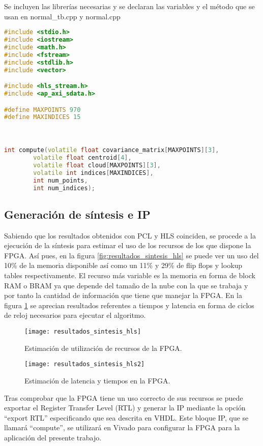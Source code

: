Se incluyen las librerías necesarias y se declaran las variables y el método que se usan en normal\_tb.cpp y normal.cpp

\begin{lstlisting}[language=C++,breaklines]
#include <stdio.h>
#include <iostream>
#include <math.h>
#include <fstream>
#include <stdlib.h>
#include <vector>

#include <hls_stream.h>
#include <ap_axi_sdata.h>

#define MAXPOINTS 970
#define MAXINDICES 15



int compute(volatile float covariance_matrix[MAXPOINTS][3],
		volatile float centroid[4],
		volatile float cloud[MAXPOINTS][3],
		volatile int indices[MAXINDICES],
		int num_points,
		int num_indices);
\end{lstlisting}


\subsection{Generación de síntesis e IP}

Sabiendo que los resultados obtenidos con PCL y HLS coinciden, se procede a la ejecución de la síntesis para estimar el uso de los recursos de los que dispone la FPGA. Así pues, en la figura \ref{fig:resultados_sintesis_hls} se puede ver un uso del 10\% de la memoria disponible así como un 11\% y 29\% de flip flops y lookup tables respectivamente. El recurso más variable es la memoria en forma de block RAM o BRAM ya que depende del tamaño de la nube con la que se trabaja y por tanto la cantidad de información que tiene que manejar la FPGA. En la figura \ref{fig:resultados_sintesis_hls2} se aprecian resultados referentes a tiempos y latencia en forma de ciclos de reloj necesarios para ejecutar el algoritmo.

\begin{figure}[!htb]
  \texttt{[image: resultados\_sintesis\_hls]}
  \caption{Estimación de utilización de recursos de la FPGA.}\label{fig:resultados_sintesis_hls}
\endminipage\hfill
{}
  \texttt{[image: resultados\_sintesis\_hls2]}
  \caption{Estimación de latencia y tiempos en la FPGA.}\label{fig:resultados_sintesis_hls2}
\endminipage\hfill
\end{figure}

Tras comprobar que la FPGA tiene un uso correcto de sus recursos se puede exportar el Register Transfer Level (RTL) y generar la IP mediante la opción ``export RTL'' especificando que sea descrita en VHDL. Este bloque IP, que se llamará ``compute'', se utilizará en Vivado para configurar la FPGA para la aplicación del presente trabajo.

